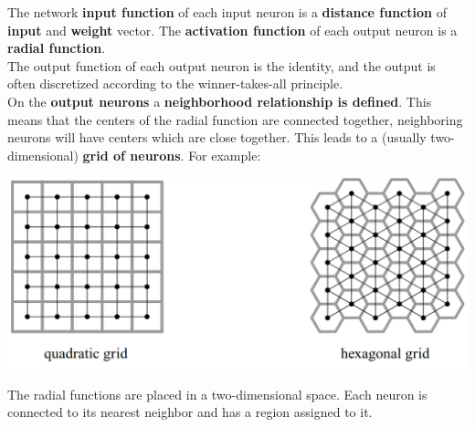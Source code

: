 \documentclass[11pt]{article}
\begin{document}
		The network \textbf{input function} of each input neuron is a \textbf{distance function} of \textbf{input} and \textbf{weight} vector. The \textbf{activation function} of each output neuron is a \textbf{radial function}. \\
		
		The output function of each output neuron is the identity, and the output is often discretized according to the winner-takes-all principle. \\
		
		On the \textbf{output neurons} a \textbf{neighborhood relationship is defined}. This means that the centers of the radial function are connected together, neighboring neurons will have centers which are close together. This leads to a (usually two-dimensional) \textbf{grid of neurons}. For example:
		\begin{center}
			\includegraphics[width=0.85\columnwidth]{img/NN/SOM1}
		\end{center}
		
		The radial functions are placed in a two-dimensional space. Each neuron is connected to its nearest neighbor and has a region assigned to it. \\
		
		
		
	
\end{document}
